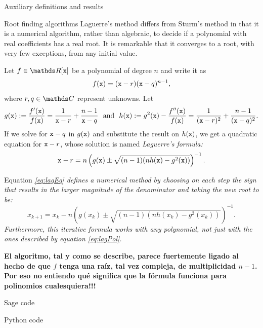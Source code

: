 \documentclass[11pt, a4paper, english, twoside, notitlepage, openright]{report}
\begin{document}
\begin{chapter}{Auxiliary definitions and results}
\begin{section}{Root finding algorithms}
Laguerre's method differs from Sturm's method in that it is a numerical algorithm, rather than algebraic, to decide if a polynomial with real coefficients has a real root. It is remarkable that it converges to a root, with very few exceptions, from any initial value.

\begin{proposition}\label{laguerre}
Let $f\in\R[{\tt x}]$ be a polynomial of degree $n$ and write it as
\begin{equation}\label{eq:lagPol}
f({\tt x})=({\tt x}-r)({\tt x}-q)^{n-1},
\end{equation}
where $r,q\in\C$ represent unknowns. Let 
$$
g({\tt x}):=\frac{f'({\tt x})}{f({\tt x})}=\frac{1}{{\tt x}-r}+\frac{n-1}{{\tt x}-q} \ \text{ and } \ h({\tt x}):=g^2({\tt x})-\frac{f''({\tt x})}{f({\tt x})}=\frac{1}{({\tt x}-r)^2}+\frac{n-1}{({\tt x}-q)^2}.
$$
If we solve for ${\tt x}-q$ in $g({\tt x})$ and substitute the result on $h({\tt x})$, we get a quadratic equation for ${\tt x}-r$, whose solution is named \em Laguerre's formula\em:
\begin{equation}\label{eq:lagEq}
{\tt x}-r=n\left(g({\tt x})\pm\sqrt{(n-1)(nh({\tt x})-g^2({\tt x}))}\right)^{-1}.
\end{equation}

Equation \em \ref{eq:lagEq} \em defines a numerical method by choosing on each step the sign that results in the larger magnitude of the denominator and taking the new root to be:
$$
x_{k+1}=x_k-n\left(g(x_k)\pm\sqrt{ (n-1)(nh(x_k)-g^2(x_k))}\right)^{-1}.
$$
Furthermore, this iterative formula works with any polynomial, not just with the ones described by equation \em \ref{eq:lagPol}. \em 
\end{proposition}

{\bf El algoritmo, tal y como se describe, parece fuertemente ligado al hecho de que $f$ tenga una ra\'iz, tal vez compleja, de multiplicidad $n-1$. Por eso no entiendo qu\'e significa que la f\'ormula funciona para polinomios cualesquiera!!!}


\end{section}
\end{chapter}

\begin{chapter}{Sage code}

\end{chapter}

\begin{chapter}{Python code}

\end{chapter}
\end{document}

